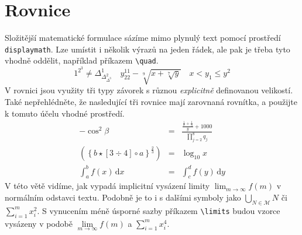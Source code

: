\documentclass[twocolumn,a4paper,11pt]{article}
\begin{document}
\section{Rovnice}
\label{sec:rovnice}
Složitější matematické formulace sázíme mimo plynulý text pomocí prostředí \verb|displaymath|. Lze umístit i několik výrazů na jeden řádek, ale pak je třeba tyto vhodně oddělit, například příkazem \verb|\quad|.
\[1^{2^3}\neq \Delta^1_{\Delta^2_{\Delta^3}}\quad y^{11}_{22}-\sqrt[9]{x+\sqrt[7]{y}}\quad x < y_1\leq y^2\]
V rovnici jsou využity tři typy závorek s různou \emph{explicitně} definovanou velikostí. Také nepřehlédněte, že nasledující tři rovnice mají zarovnaná rovnítka, a použijte k tomuto účelu vhodné prostředí.
\begin{eqnarray}
    -\cos^2\beta & = & \frac{\frac{\frac{1}{x}+\frac{1}{3}}{y}+1000}{\prod\limits_{j=2}^8 q_j} \\
    \left(\left\{b\star[3 \div 4]\circ a\right\}^\frac{2}{3}\right) & = & \log_10 x \\
    \int_a^b f(x)\,\mathrm{d}x & = & \int_c^d f(y)\,\mathrm{d}y
\end{eqnarray}
V této větě vidíme, jak vypadá implicitní vysázení limity $\lim_{m\rightarrow \infty} f(m)$ v normálním odstavci textu. Podobně je to i s dalšími symboly jako $\bigcup_{N\in\mathcal{M}} N$ či $\sum^{m}_{i=1} x^2_i$.
S vynucením méně úsporné sazby příkazem \verb|\limits| budou vzorce vysázeny v podobě $\lim\limits_{m\rightarrow \infty} f(m)$ a $\sum\limits_{i=1}^{m} x^{4}_{i}$.
\end{document}
